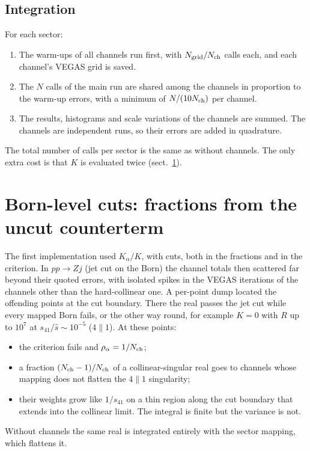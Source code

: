 \documentclass[11pt,a4paper]{article}
\newcommand{\Nch}{N_{\rm ch}}
\begin{document}
\subsection{Integration}
For each sector:
\begin{enumerate}
\item The warm-ups of all channels run first, with $N_{\rm grid}/\Nch$ calls
      each, and each channel's VEGAS grid is saved.
\item The $N$ calls of the main run are shared among the channels in
      proportion to the warm-up errors, with a minimum of $N/(10\Nch)$ per
      channel.
\item The results, histograms and scale variations of the channels are
      summed. The channels are independent runs, so their errors are added
      in quadrature.
\end{enumerate}
The total number of calls per sector is the same as without channels. The only
extra cost is that $K$ is evaluated twice (sect.~\ref{sec:cuts}).

\section{Born-level cuts: fractions from the uncut counterterm}
\label{sec:cuts}

The first implementation used $K_\alpha/K$, with cuts, both in the
fractions and in the criterion. In $pp\to Zj$ (jet cut on the Born) the
channel totals then scattered far beyond their quoted errors, with isolated
spikes in the VEGAS iterations of the channels other than the hard-collinear
one. A per-point dump located the offending points at the cut boundary. There
the real passes the jet cut while every mapped Born fails, or the other way
round, for example $K=0$ with $R$ up to $10^{7}$ at $s_{41}/\hat s\sim10^{-5}$
($4\parallel1$). At these points:
\begin{itemize}
\item the criterion fails and $\rho_\alpha=1/\Nch$;
\item a fraction $(\Nch-1)/\Nch$ of a collinear-singular real goes to channels
      whose mapping does not flatten the $4\parallel1$ singularity;
\item their weights grow like $1/s_{41}$ on a thin region along the cut
      boundary that extends into the collinear limit. The integral is finite
      but the variance is not.
\end{itemize}
Without channels the same real is integrated entirely with the sector
mapping, which flattens it.
\end{document}
